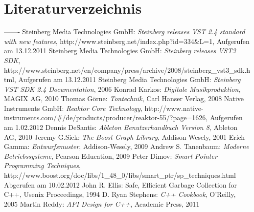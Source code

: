 \section{Literaturverzeichnis}
\begin{thebibliography}{-------}
		Steinberg Media Technologies GmbH:
		{\em Steinberg releases VST 2.4 standard with new features},
		http://www.steinberg.net/index.php?id=334\&L=1, Aufgerufen am 13.12.2011
		Steinberg Media Technologies GmbH:
		{\em Steinberg releases VST3 SDK},
		http://www.steinberg.net/en/company/press/archive/2008/steinberg\_vst3\_sdk.html, Aufgerufen am 13.12.2011
		Steinberg Media Technologies GmbH:
		{\em Steinberg VST SDK 2.4 Documentation}, 2006
		Konrad Karkos: \emph{Digitale Musikproduktion}, MAGIX AG, 2010
		Thomas Görne: \emph{Tontechnik}, Carl Hanser Verlag, 2008
		Native Instruments GmbH:
		{\em Reaktor Core Technology},
		http://www.native-instruments.com/\#/de/products/producer/reaktor-55/?page=1626, Aufgerufen am 1.02.2012
		Dennis DeSantis: \emph{Ableton Benutzerhandbuch Version 8}, Ableton AG, 2010
		Jeremy G.Siek: \emph{The Boost Graph Library}, Addison-Wesely, 2001
		Erich Gamma: \emph{Entwurfsmuster}, Addison-Wesely, 2009
         Andrew S. Tanenbaum: \emph{Moderne Betriebssysteme}, Pearson Education, 2009
		Peter Dimov: \emph{Smart Pointer Programming Techniques},
		http://www.boost.org/doc/libs/1\_48\_0/libs/smart\_ptr/sp\_techniques.html\, 
		Abgerufen am 10.02.2012
		John R. Ellis: {Safe, Efficient Garbage Collection for C++},
		Usenix Proceedings, 1994
		D. Ryan Stephens: \emph{C++ Cookbook}, O'Reilly, 2005
		Martin Reddy: \emph{API Design for C++}, Academic Press, 2011
\end{thebibliography}


